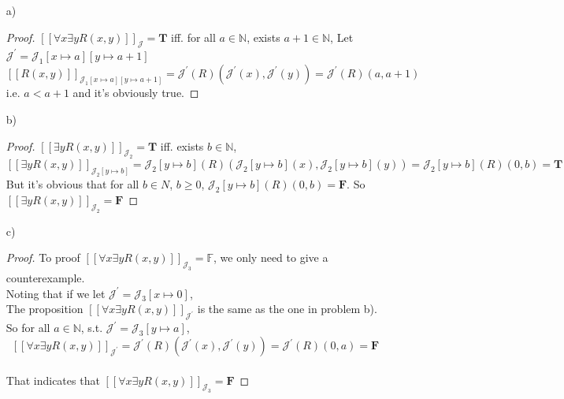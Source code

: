 \documentclass{article}
\begin{document}
\begin{itemize}
    \item[a)]
    \begin{proof}
        $
            [\![ \forall x \exists y R(x, y) ]\!]_\mathcal{J} = \mathbf{T}
        $
        iff. for all $a \in \mathbb{N}$, exists $a + 1 \in \mathbb{N}$, Let $\mathcal{J^\prime} = \mathcal{J}_1 [x \mapsto a][y \mapsto a + 1]$ 
        \[
            [\![ R(x, y) ]\!]_{\mathcal{J}_1 [x \mapsto a][y \mapsto a + 1]} = \mathcal{J}^\prime (R)(\mathcal{J}^\prime(x), \mathcal{J}^\prime(y)) = \mathcal{J}^\prime(R)(a, a + 1) 
        \]
        i.e. $ a < a + 1 $ and it's obviously true.
    \end{proof}
    \item[b)]
    \begin{proof}
         $ [\![ \exists y R(x, y) ]\!]_{\mathcal{J}_2} = \mathbf{T} $ 
        iff. exists $b \in \mathbb{N}$, 
        $$
            [\![ \exists y R(x, y) ]\!]_{\mathcal{J}_2[y \mapsto b]} = 
            \mathcal{J}_2[y \mapsto b] (R)(\mathcal{J}_2[y \mapsto b](x), \mathcal{J}_2[y \mapsto b](y)) = \mathcal{J}_2[y \mapsto b] (R)(0, b) = \mathbf{T}
        $$
        But it's obvious that for all $b \in N$, $b \geqslant 0$, $\mathcal{J}_2[y \mapsto b] (R)(0, b) = \mathbf{F}$. So $ [\![ \exists y R(x, y) ]\!]_{\mathcal{J}_2} = \mathbf{F} $ 
        \qedhere
    \end{proof}
    \item[c)]
    \begin{proof}
        To proof $[\![ \forall x \exists y R(x, y) ]\!]_{\mathcal{J}_3} = \mathbb{F}$, we only need to give a counterexample. \\
        Noting that if we let $\mathcal{J}^\prime = \mathcal{J}_3[x \mapsto 0]$, \\
        The proposition $ [\![ \forall x \exists y R(x, y) ]\!]_{\mathcal{J}^\prime} $ is the same as the one in problem b). \\
        So for all  $a \in \mathbb{N}$, s.t. $\mathcal{J}^\prime = \mathcal{J}_3[y \mapsto a]$, 
        $$ [\![ \forall x \exists y R(x, y) ]\!]_{\mathcal{J}^\prime} = \mathcal{J}^\prime(R)(\mathcal{J}^\prime(x), \mathcal{J}^\prime(y)) = \mathcal{J}^\prime(R)(0, a) = \mathbf{F}$$ \\
        That indicates that $ [\![ \forall x \exists y R(x, y) ]\!]_{\mathcal{J}_3} = \mathbf{F} $
    \end{proof}
\end{itemize}
\end{document}

